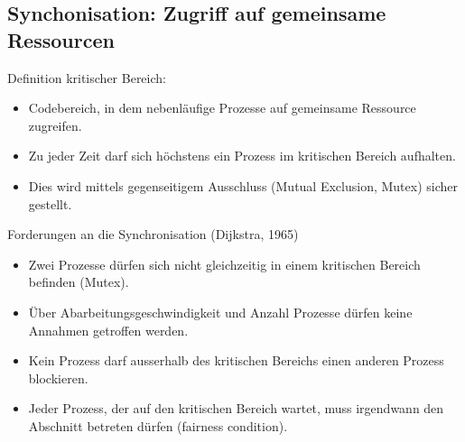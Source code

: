 \subsection{Synchonisation: Zugriff auf gemeinsame Ressourcen }
Definition kritischer Bereich: 
\begin{itemize}
  \item Codebereich, in dem nebenläufige Prozesse auf gemeinsame Ressource
  zugreifen. 
  \item Zu jeder Zeit darf sich höchstens ein Prozess im kritischen Bereich
  aufhalten. 
  \item Dies wird mittels gegenseitigem Ausschluss (Mutual Exclusion, Mutex)
  sicher gestellt. 
\end{itemize}
Forderungen an die Synchronisation (Dijkstra, 1965)
\begin{itemize}
  \item Zwei Prozesse dürfen sich nicht gleichzeitig in einem kritischen Bereich
  befinden (Mutex).
  \item Über Abarbeitungsgeschwindigkeit und Anzahl Prozesse dürfen keine
  Annahmen getroffen werden. 
  \item Kein Prozess darf ausserhalb des kritischen Bereichs einen anderen
  Prozess blockieren. 
  \item Jeder Prozess, der auf den kritischen Bereich wartet, muss irgendwann
  den Abschnitt betreten dürfen (fairness condition). 
\end{itemize}


